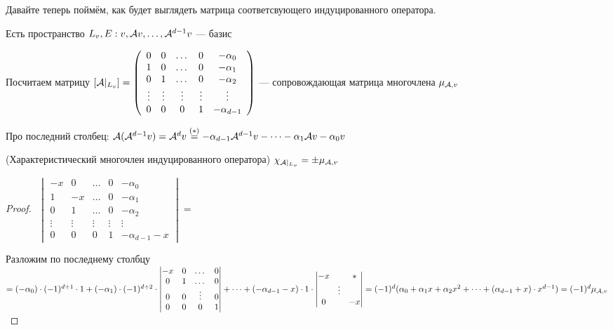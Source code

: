 \vspace*{3mm}
Давайте теперь поймём, как будет выглядеть матрица соответсвующего индуцированного оператора.
\vspace*{3mm}

\begin{conj}
    Есть пространство $ L_v, E: v, \mathcal{A} v, \dots, \mathcal{A}^{d - 1}v $ --- базис 

    Посчитаем матрицу $[\mathcal{A} |_{L_{v}}] = 
    \left(\begin{array}{ccccc}
        0 & 0 & \dots & 0 & -\alpha_0 \\ 
        1 & 0 & \dots & 0 & -\alpha_1 \\ 
        0 & 1 & \dots & 0 & -\alpha_2 \\ 
        \vdots & \vdots & \vdots & \vdots & \vdots \\ 
        0 & 0 & 0 & 1 & -\alpha_{d - 1}
    \end{array}\right)$ --- сопровождающая матрица многочлена $\mu_{\mathcal{A}, v}$
        
    Про последний столбец: $\mathcal{A}(\mathcal{A}^{d - 1}v) = \mathcal{A}^d v \stackrel{(*)}{=} - \alpha_{d - 1} \mathcal{A}^{d - 1}v - \dots - \alpha_1 \mathcal{A} v - \alpha_0 v $
        
\end{conj}

\begin{lemma}(Характеристический многочлен индуцированного оператора)
    $\chi_{\mathcal{A} |_{L_v}} = \pm \mu_{\mathcal{A}, v}$
    \begin{proof}
    $ $ \newline
    $\begin{vmatrix*}
        -x & 0 & \dots & 0 & -\alpha_0 \\ 
        1 & -x & \dots & 0 & -\alpha_1 \\ 
        0 & 1 & \dots & 0 & -\alpha_2 \\ 
        \vdots & \vdots & \vdots & \vdots & \vdots \\ 
        0 & 0 & 0 & 1 & -\alpha_{d - 1} - x
    \end{vmatrix*} = $

    Разложим по последнему столбцу \\
    $ = (- \alpha_0) \cdot (-1)^{d + 1} \cdot 1 + (-\alpha_1) \cdot (-1)^{d + 2} \cdot 
    \begin{vmatrix*}
        -x & 0 & \dots & 0 \\ 
        0 & 1 & \dots & 0 \\ 
        0 & 0 & \vdots & 0 \\ 
        0 & 0 & 0 & 1
    \end{vmatrix*} + \dots + (-\alpha_{d - 1} - x) \cdot 1 \cdot
    \begin{vmatrix*}
        -x &  & * \\ 
        & \vdots &  \\ 
        0 &  & -x
    \end{vmatrix*} = (-1)^d (\alpha_0 + \alpha_1 x + \alpha_2 x^2 + \dots + (\alpha_{d - 1} + x) \cdot x^{d - 1}) = (-1)^d \mu_{\A, v}$
    \end{proof}
\end{lemma}


